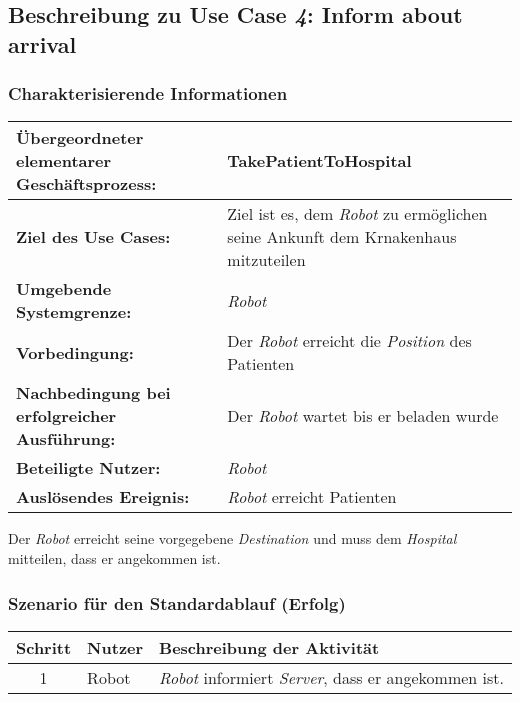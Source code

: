 		\pagebreak
		
			\subsection{Beschreibung zu Use Case \emph{4}: Inform about arrival}

			\subsubsection*{Charakterisierende Informationen}

			\begin{table}[H]
				\centering
				\begin{tabularx}{\textwidth}{@{}p{5cm}X@{}}
				\hline
				\textbf{Übergeordneter elementarer Geschäftsprozess:} & TakePatientToHospital\\ \hline
				\textbf{Ziel des Use Cases:} & Ziel ist es, dem \emph{Robot} zu ermöglichen seine Ankunft dem Krnakenhaus mitzuteilen\\ \hline
				\textbf{Umgebende Systemgrenze:} & \emph{Robot}\\ \hline
				\textbf{Vorbedingung:} & Der \emph{Robot} erreicht die \emph{Position} des Patienten\\ \hline
				\textbf{Nachbedingung bei erfolgreicher Ausführung:} & Der \emph{Robot} wartet bis er beladen wurde\\ \hline
				\textbf{Beteiligte Nutzer:} & \emph{Robot}\\ \hline
				\textbf{Auslösendes Ereignis:} & \emph{Robot} erreicht Patienten\\
				\hline
				\end{tabularx}
			\end{table}

			Der \emph{Robot} erreicht seine vorgegebene \emph{Destination} und muss dem \emph{Hospital} mitteilen, dass er angekommen ist. 

			\subsubsection*{Szenario für den Standardablauf (Erfolg)}

			\begin{table}[H]
				\centering
				\begin{tabularx}{\textwidth}{@{}cp{2cm}X@{}}
				\hline
				Schritt & Nutzer & Beschreibung der Aktivität \\ \hline
				1 & Robot & \emph{Robot} informiert \emph{Server}, dass er angekommen ist.
				\hline
				\end{tabularx}
			\end{table}

